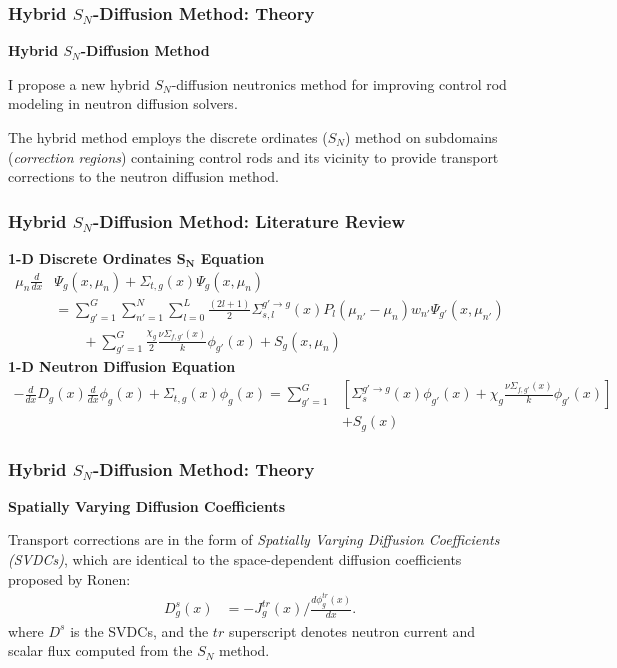\begin{frame}
  \frametitle{Hybrid $S_N$-Diffusion Method: Theory}
  \textbf{Hybrid $S_N$-Diffusion Method}
  \vspace{.3cm}

  I propose a new hybrid $S_N$-diffusion neutronics method for improving control rod modeling in
  neutron diffusion solvers.

  The hybrid method employs the discrete ordinates ($S_N$) method on subdomains (\textit{correction
  regions}) containing control rods and its vicinity to provide transport corrections to the
  neutron diffusion method.
\end{frame}

\begin{frame}
  \frametitle{Hybrid $S_N$-Diffusion Method: Literature Review}
  \textbf{1-D Discrete Ordinates $\bm{S_N}$ Equation}
  \begin{align}
    \mu_n \frac{d}{dx}&\Psi_g(x, \mu_n) + \Sigma_{t,g}(x)\Psi_g(x, \mu_n) \nonumber \\
                      &=\sum^G_{g'=1} \sum^N_{n'=1} \sum^L_{l=0}
                        \frac{\left(2l+1\right)}{2} \Sigma^{g'\rightarrow g}_{s,l}(x)
                        P_l(\mu_{n'} - \mu_n) w_{n'}\Psi_{g'}(x,\mu_{n'}) \nonumber \\
                      &\qquad + \sum^G_{g'=1} \frac{\chi_g}{2}
                        \frac{\nu\Sigma_{f,g'}(x)}{k} \phi_{g'}(x) + S_g(x,\mu_n)
    \label{eq:1d-sn}
  \end{align}
  \textbf{1-D Neutron Diffusion Equation}
  \begin{align}
    -\frac{d}{dx} D_g(x) \frac{d}{dx} \phi_g(x) + \Sigma_{t,g}(x) \phi_g(x) = \sum^G_{g'=1}&\left[
      \Sigma_s^{g'\rightarrow g}(x)\phi_{g'}(x) + \chi_g\frac{\nu\Sigma_{f,g'}(x)}{k}
    \phi_{g'}(x)\right] \nonumber \\
                                   &+ S_g(x)
    \label{eq:1d-diff}
  \end{align}
\end{frame}

\begin{frame}
  \frametitle{Hybrid $S_N$-Diffusion Method: Theory}
  \textbf{Spatially Varying Diffusion Coefficients}
  \vspace{.3cm}

  Transport corrections are in the form of \textit{Spatially Varying Diffusion Coefficients
  (SVDCs)}, 
  which are identical to the space-dependent diffusion coefficients
  proposed by Ronen:
  \begin{align}
    D^s_g(x) &= -J^{tr}_g(x)\bigg/\frac{d\phi^{tr}_g(x)}{dx}. \label{eq:svdc}
  \end{align}
  where $D^s$ is the \glspl{SVDC}, and the $tr$ superscript denotes neutron
  current and scalar flux computed from the $S_N$ method.
\end{frame}

